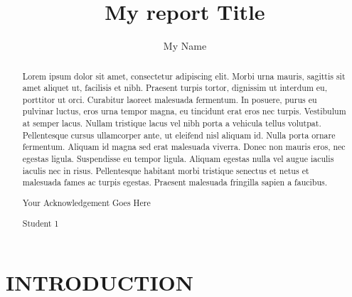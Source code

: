 \documentclass{fisatproject}
\title{My report Title}
\author{My Name}
\begin{document}
\maketitle

\makecert

\newpage
\thispagestyle{plain}
\setcounter{page}{1}
\renewcommand\abstractname{ABSTRACT}
\begin{abstract}
\vspace{5cm}
Lorem ipsum dolor sit amet, consectetur adipiscing elit. Morbi urna mauris, sagittis sit amet aliquet ut, facilisis et nibh. Praesent turpis tortor, dignissim ut interdum eu, porttitor ut orci. Curabitur laoreet malesuada fermentum. In posuere, purus eu pulvinar luctus, eros urna tempor magna, eu tincidunt erat eros nec turpis. Vestibulum at semper lacus. Nullam tristique lacus vel nibh porta a vehicula tellus volutpat. Pellentesque cursus ullamcorper ante, ut eleifend nisl aliquam id. Nulla porta ornare fermentum. Aliquam id magna sed erat malesuada viverra. Donec non mauris eros, nec egestas ligula. Suspendisse eu tempor ligula. Aliquam egestas nulla vel augue iaculis iaculis nec in risus. Pellentesque habitant morbi tristique senectus et netus et malesuada fames ac turpis egestas. Praesent malesuada fringilla sapien a faucibus.
\end{abstract}


\newpage
\thispagestyle{plain}
\renewcommand\abstractname{ACKNOWLEDGMENT}
\begin{abstract}
\vspace{5cm}
Your Acknowledgement Goes Here
\vspace{1cm}
\begin{flushright}
Student 1
\end{flushright}
\end{abstract}
\newpage

\restoregeometry
\tableofcontents
\newpage

\cleardoublepage
{}
\listoffigures
\newpage

\cleardoublepage
{}
\listoftables
\newpage



\chapter{INTRODUCTION}
\setcounter{page}{1}
\renewcommand{\baselinestretch}{1.50}
\end{document}
